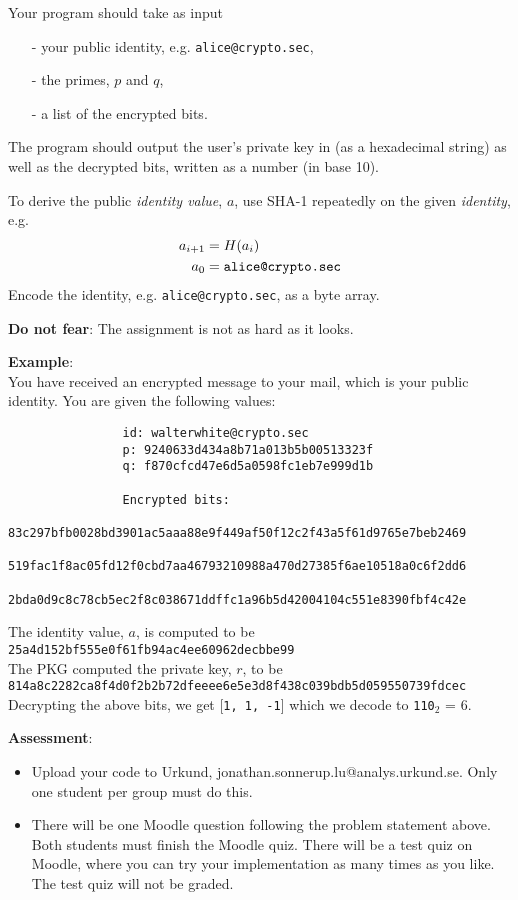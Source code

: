 \documentclass{article}
\begin{document}
\begin{description}
{				Your program should take as input
				\begin{itemize}
					\item[-] your public identity, e.g. \texttt{alice@crypto.sec},
					\item[-] the primes, $p$ and $q$,
					\item[-] a list of the encrypted bits.
				\end{itemize}
				The program should output the user's private key in (as a hexadecimal string) as well as the decrypted bits, written as a number (in base 10).
				
				To derive the public \emph{identity value}, $a$, use SHA-1 repeatedly on the given \emph{identity}, e.g.
				\begin{align*}
				a_{i+1} &= H(a_i) \\
				a_0 &= \text{\texttt{alice@crypto.sec}}
				\end{align*}
				Encode the identity, e.g. \texttt{alice@crypto.sec}, as a byte array.
				
				\textbf{Do not fear}: The assignment is not as hard as it looks.
				
				\textbf{Example}:\\
				You have received an encrypted message to your mail, which is your public identity.
				You are given the following values:
				\begin{verbatim}
				id: walterwhite@crypto.sec
				p: 9240633d434a8b71a013b5b00513323f
				q: f870cfcd47e6d5a0598fc1eb7e999d1b
				
				Encrypted bits:
				83c297bfb0028bd3901ac5aaa88e9f449af50f12c2f43a5f61d9765e7beb2469
				519fac1f8ac05fd12f0cbd7aa46793210988a470d27385f6ae10518a0c6f2dd6
				2bda0d9c8c78cb5ec2f8c038671ddffc1a96b5d42004104c551e8390fbf4c42e
				\end{verbatim}
				The identity value, $a$, is computed to be\\
				\texttt{25a4d152bf555e0f61fb94ac4ee60962decbbe99}\\
				The PKG computed the private key, $r$, to be\\
				\texttt{814a8c2282ca8f4d0f2b2b72dfeeee6e5e3d8f438c039bdb5d059550739fdcec}\\
				Decrypting the above bits, we get [\texttt{1, 1, -1}] which we decode to \texttt{110}$_2$ = $6$.

				
			
				
				\textbf{Assessment}:
				\begin{itemize}
					\item Upload your code to Urkund, jonathan.sonnerup.lu@analys.urkund.se.
					Only one student per group must do this.
					
					\item There will be one Moodle question following the problem statement above. 
					Both students must finish the Moodle quiz.
					There will be a test quiz on Moodle, where you can try your implementation as many times as you like. 
					The test quiz will not be graded.
				\end{itemize}
			}
			
		\end{description}
		
	
\end{document}
